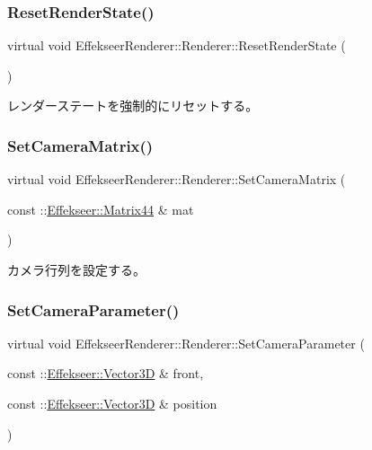 \subsubsection{\texorpdfstring{Reset\+Render\+State()}{ResetRenderState()}}
{\footnotesize\ttfamily virtual void Effekseer\+Renderer\+::\+Renderer\+::\+Reset\+Render\+State (\begin{DoxyParamCaption}{ }\end{DoxyParamCaption})\hspace{0.3cm}{\ttfamily [pure virtual]}}



レンダーステートを強制的にリセットする。 

\mbox{\label{class_effekseer_renderer_1_1_renderer_a406e4bf44f11d3437af46cca718529b0}} 
\subsubsection{\texorpdfstring{Set\+Camera\+Matrix()}{SetCameraMatrix()}}
{\footnotesize\ttfamily virtual void Effekseer\+Renderer\+::\+Renderer\+::\+Set\+Camera\+Matrix (\begin{DoxyParamCaption}\item[{const \+::\mbox{\hyperlink{struct_effekseer_1_1_matrix44}{Effekseer\+::\+Matrix44}} \&}]{mat }\end{DoxyParamCaption})\hspace{0.3cm}{\ttfamily [pure virtual]}}



カメラ行列を設定する。 

\mbox{\label{class_effekseer_renderer_1_1_renderer_aab9cecfcbbc9c3c0a968ce47704fc157}} 
\subsubsection{\texorpdfstring{Set\+Camera\+Parameter()}{SetCameraParameter()}}
{\footnotesize\ttfamily virtual void Effekseer\+Renderer\+::\+Renderer\+::\+Set\+Camera\+Parameter (\begin{DoxyParamCaption}\item[{const \+::\mbox{\hyperlink{struct_effekseer_1_1_vector3_d}{Effekseer\+::\+Vector3D}} \&}]{front,  }\item[{const \+::\mbox{\hyperlink{struct_effekseer_1_1_vector3_d}{Effekseer\+::\+Vector3D}} \&}]{position }\end{DoxyParamCaption})\hspace{0.3cm}{\ttfamily [pure virtual]}}



